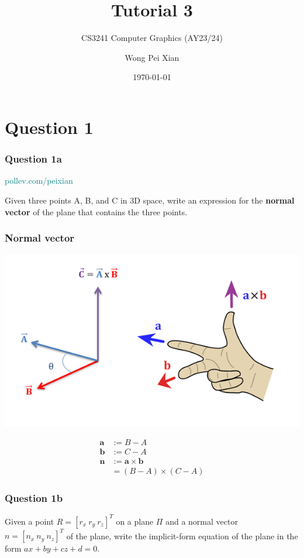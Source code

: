 \documentclass{beamer}
\title{Tutorial 3}
\subtitle{CS3241 Computer Graphics (AY23/24)}
\date{\today}
\author{Wong Pei Xian}
\institute[]{\email{e0389023@u.nus.edu}}
\begin{document}
\frame[plain]{\titlepage}

\section{Question 1}

\begin{frame}
    \frametitle{Question 1a}

    \begin{tcolorbox}[colback=teal!5!white]
        \textcolor{teal}{pollev.com/peixian}
    \end{tcolorbox}

    Given three points A, B, and C in 3D space, write an expression for the \textbf{normal vector}
    of the plane that contains the three points.
\end{frame}

\begin{frame}
    \frametitle{Normal vector}

    \begin{center}
        \includegraphics[scale=0.6]{images/cross-prod-righthand.png}
    \end{center}

    \begin{align*}
        \mathbf{a} &:= B - A \\
        \mathbf{b} &:= C - A \\
        \mathbf{n} &:= \mathbf{a} \times \mathbf{b} \\
        &= (B-A) \times (C-A)
    \end{align*}


\end{frame}

\begin{frame}
    \frametitle{Question 1b}

    Given a point $R = [r_x \  r_y \  r_z]^T$ on a plane $\Pi$ and a normal vector 
    $n = [n_x \  n_y \  n_z]^T$ of the plane, write the implicit-form equation of 
    the plane in the form $ax + by + cz + d = 0$.

\end{frame}
\end{document}
